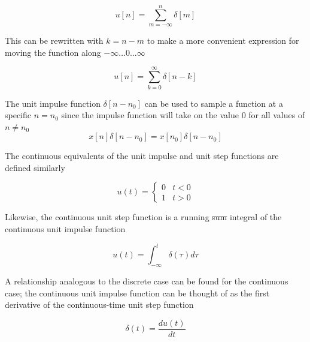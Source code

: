 \documentclass[../notes.tex]{subfiles}
\begin{document}
\begin{equation}
	u[n] = \sum_{m=-\infty}^n \delta[m]
\end{equation}

This can be rewritten with $ k = n-m $ to make a more convenient expression for moving the function along $ -\infty\ldots0\ldots\infty $ 

\begin{equation}
	u[n] = \sum_{k=0}^\infty \delta[n-k]
\end{equation}




\begin{theorem}
	
The unit impulse function $ \delta[n-n_0] $ can be used to sample a function at a specific $ n = n_0 $ since the impulse function will take on the value $ 0 $ for all values of $ n \neq  n_0$ 
\begin{equation}
	x[n] \delta[n-n_0] = x[n_0]\delta[n-n_0]
\end{equation}
\end{theorem}





The continuous equivalents of the unit impulse and unit step functions are defined similarly

\begin{definition}
	
\begin{equation}
	u(t) = \begin{cases}
		0 & t < 0 \\
		1 & t > 0
	\end{cases}
\end{equation}
\end{definition}


Likewise, the continuous unit step function is a running \st{sum} integral of the continuous unit impulse function

\begin{equation}
	u(t) = \int^{t}_{-\infty} \delta(\tau)d\tau
	\label{eq:355:unit_step_cont}
\end{equation}


A relationship analogous to the discrete case can be found for the continuous case; the continuous unit impulse function can be thought of as the first derivative of the continuous-time unit step function

\begin{definition}
\begin{equation}
	\delta(t) = \frac{du(t)}{dt}
	\label{eq:355:unit_impulse_continuous}
\end{equation}
	
\end{definition}
\end{document}
